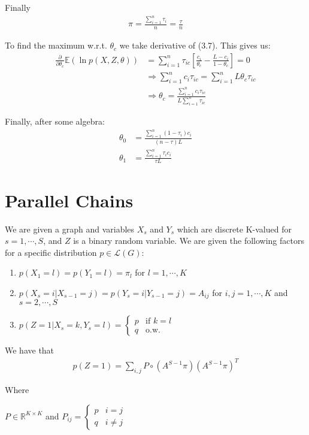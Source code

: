 \documentclass[paper=a4, fontsize=11pt]{scrartcl} %
\numberwithin{equation}{section} %
\numberwithin{figure}{section} %
\numberwithin{table}{section} %
\begin{document}
Finally 
\begin{align}
\pi = \frac{\sum_{i=1}^n \tau_{i}}{n} = \frac{\tau}{n}
\end{align}

To find the maximum w.r.t. \(\theta_c\) we take derivative of (3.7). This gives us:
\begin{align}
\frac{\partial}{\partial \theta_c}\mathbb{E}\left( \ln p(X,Z,\theta) \right)&=\sum_{i=1}^n \tau_{ic} \left[\frac{c_i}{\theta_c}-\frac{L-c_i}{1-\theta_c}\right]=0\\
&\Rightarrow \sum_{i=1}^n c_i\tau_{ic} = \sum_{i=1}^n L\theta_c\tau_{ic}\\
&\Rightarrow \theta_c = \frac{\sum_{i=1}^n c_i\tau_{ic}}{L\sum_{i=1}^n \tau_{ic}}
\end{align}

Finally, after some algebra:
\begin{align}
\theta_0 &= \frac{\sum_{i=1}^n (1-\tau_i)c_i}{(n-\tau)L}\\
\theta_1 &= \frac{\sum_{i=1}^n \tau_{i}c_i}{\tau L}
\end{align}

\section{Parallel Chains}

We are given a graph and variables $X_s$ and $Y_s$ which are discrete K-valued for $s = 1, \cdots, S$, and $Z$ is a binary random variable. We are given the following factors for a specific distribution $p\in \mathcal{L}(G)$:
\begin{enumerate}
	\item $p(X_1 = l) = p(Y_1 = l) = \pi_l$ for $l = 1, \cdots , K$
	\item $p(X_s = i | X_{s-1} = j) = p(Y_s = i | Y_{s-1} = j) = A_{ij}$ for $i, j = 1, \cdots , K$ and $s = 2, \cdots, S$
	\item $p(Z = 1|X_s = k, Y_s = l) = \begin{cases}
	p & \text{if $k=l$}\\
	q & \text{o.w.}
	\end{cases}$
\end{enumerate}

We have that 
\begin{align}
p(Z=1) = \sum_{i,j} P \circ (A^{S-1}\pi)(A^{S-1}\pi)^T
\end{align}

Where 

$P\in\mathbb{R}^{K\times K}$ and $P_{ij} = \begin{cases}p & i=j \\
q & i\ne j\end{cases}$
\\
\end{document}
